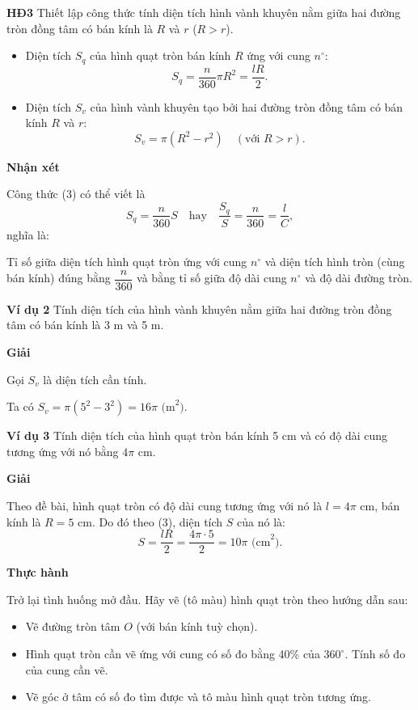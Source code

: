 \begin{lesson}
\begin{enumerate}[label=\alph*)]
        \answerline
    \end{enumerate}

    \textbf{HĐ3} Thiết lập công thức tính diện tích hình vành khuyên nằm giữa hai đường tròn đồng tâm có bán kính là $R$ và $r$ ($R>r$).

    \answerline
    \answerline

    \begin{keyconcept}
        \begin{itemize}
            \item Diện tích $S_q$ của hình quạt tròn bán kính $R$ ứng với cung $n^\circ$:
            \[
                S_q=\dfrac{n}{360}\pi R^2=\dfrac{lR}{2}. \tag{3}
            \]
            \item Diện tích $S_v$ của hình vành khuyên tạo bởi hai đường tròn đồng tâm có bán kính $R$ và $r$:
            \[
                S_v=\pi(R^2-r^2)\quad (\text{với }R>r). \tag{4}
            \]
        \end{itemize}
    \end{keyconcept}

    \textbf{Nhận xét}

    Công thức (3) có thể viết là
    \[
        S_q=\dfrac{n}{360}S
        \quad\text{hay}\quad
        \dfrac{S_q}{S}=\dfrac{n}{360}=\dfrac{l}{C},
    \]
    nghĩa là:

    Tỉ số giữa diện tích hình quạt tròn ứng với cung $n^\circ$ và diện tích hình tròn (cùng bán kính) đúng bằng $\dfrac{n}{360}$ và bằng tỉ số giữa độ dài cung $n^\circ$ và độ dài đường tròn.

    \textbf{Ví dụ 2} Tính diện tích của hình vành khuyên nằm giữa hai đường tròn đồng tâm có bán kính là 3 m và 5 m.

    \textbf{Giải}

    Gọi $S_v$ là diện tích cần tính.

    Ta có $S_v=\pi(5^2-3^2)=16\pi\text{ (m}^2\text{)}$.

    \textbf{Ví dụ 3} Tính diện tích của hình quạt tròn bán kính 5 cm và có độ dài cung tương ứng với nó bằng $4\pi$ cm.

    \textbf{Giải}

    Theo đề bài, hình quạt tròn có độ dài cung tương ứng với nó là $l=4\pi$ cm, bán kính là $R=5$ cm. Do đó theo (3), diện tích $S$ của nó là:
    \[
        S=\dfrac{lR}{2}=\dfrac{4\pi\cdot5}{2}=10\pi\text{ (cm}^2\text{)}.
    \]

    \textbf{Thực hành}

    Trở lại tình huống mở đầu. Hãy vẽ (tô màu) hình quạt tròn theo hướng dẫn sau:
    \begin{itemize}
        \item Vẽ đường tròn tâm $O$ (với bán kính tuỳ chọn).
        \item Hình quạt tròn cần vẽ ứng với cung có số đo bằng 40\% của $360^\circ$. Tính số đo của cung cần vẽ.
        \item Vẽ góc ở tâm có số đo tìm được và tô màu hình quạt tròn tương ứng.
    \end{itemize}


\end{lesson}
